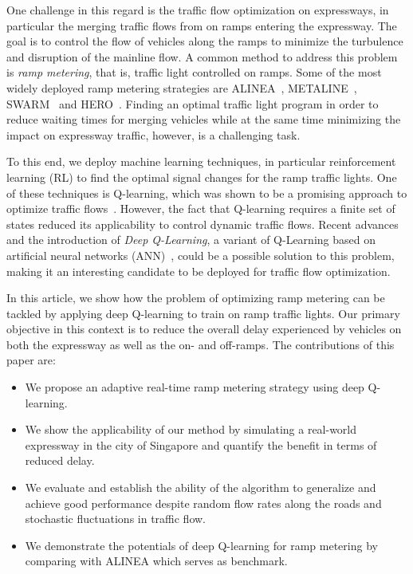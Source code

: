 \documentclass{sig-alternate-05-2015}
\begin{document}
One challenge in this regard is the traffic flow optimization on expressways, in particular the merging traffic flows from on ramps entering the expressway.
The goal is to control the flow of vehicles along the ramps to minimize the turbulence and disruption of the mainline flow. A common method to address this problem is {\it ramp metering}, that is, traffic light controlled on ramps. Some of the most widely deployed ramp metering strategies are ALINEA~\cite{papageorgiou1991alinea}, METALINE~\cite{papageorgiou1997alinea}, SWARM~\cite{paesani1997system} and HERO~\cite{papamichail2010heuristic}.
Finding an optimal traffic light program in order to reduce waiting times for merging vehicles while at the same time minimizing the impact on expressway traffic, however, is a challenging task.

To this end, we deploy machine learning techniques, in particular reinforcement learning (RL)  to find the optimal signal changes for the ramp traffic lights.
One of these techniques is Q-learning, which was shown to be a promising approach to optimize traffic flows~\cite{abdulhai2003reinforcement}.
However, the fact that Q-learning requires a finite set of states reduced its applicability to control dynamic traffic flows. 
Recent advances and the introduction of \textit{Deep Q-Learning}, a variant of Q-Learning based on artificial neural networks (ANN)~\cite{mnih2013playing,mnih2015human}, could be a possible solution to this problem, making it an interesting candidate to be deployed for traffic flow optimization.

In this article, we show how the problem of optimizing ramp metering can be tackled by applying deep Q-learning to train on ramp traffic lights.
Our primary objective in this context is to reduce the overall delay experienced by vehicles on both the expressway as well as the on- and off-ramps.
The contributions of this paper are:
\begin{itemize}
\item We propose an adaptive real-time ramp metering strategy using deep Q-learning.
\item We show the applicability of our method by simulating a real-world expressway in the city of Singapore and quantify the benefit in terms of reduced delay.
\item We evaluate and establish the ability of the algorithm to generalize and achieve good performance despite random flow rates along the roads and stochastic fluctuations in traffic flow. 
\item We demonstrate the potentials of deep Q-learning for ramp metering by comparing with ALINEA which serves as benchmark.
\end{itemize}
\end{document}
